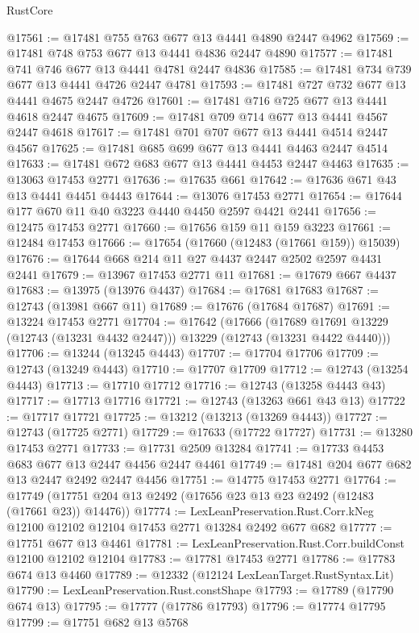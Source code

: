 \begin{lexlean}{RustCore}
\begin{coremodule}
@17561 := @17481 @755 @763 @677 @13 @4441 @4890 @2447 @4962
@17569 := @17481 @748 @753 @677 @13 @4441 @4836 @2447 @4890
@17577 := @17481 @741 @746 @677 @13 @4441 @4781 @2447 @4836
@17585 := @17481 @734 @739 @677 @13 @4441 @4726 @2447 @4781
@17593 := @17481 @727 @732 @677 @13 @4441 @4675 @2447 @4726
@17601 := @17481 @716 @725 @677 @13 @4441 @4618 @2447 @4675
@17609 := @17481 @709 @714 @677 @13 @4441 @4567 @2447 @4618
@17617 := @17481 @701 @707 @677 @13 @4441 @4514 @2447 @4567
@17625 := @17481 @685 @699 @677 @13 @4441 @4463 @2447 @4514
@17633 := @17481 @672 @683 @677 @13 @4441 @4453 @2447 @4463
@17635 := @13063 @17453 @2771
@17636 := @17635 @661
@17642 := @17636 @671 @43 @13 @4441 @4451 @4443
@17644 := @13076 @17453 @2771
@17654 := @17644 @177 @670 @11 @40 @3223 @4440 @4450 @2597 @4421 @2441
@17656 := @12475 @17453 @2771
@17660 := @17656 @159 @11 @159 @3223
@17661 := @12484 @17453
@17666 := @17654 (@17660 (@12483 (@17661 @159)) @15039)
@17676 := @17644 @668 @214 @11 @27 @4437 @2447 @2502 @2597 @4431 @2441
@17679 := @13967 @17453 @2771 @11
@17681 := @17679 @667 @4437
@17683 := @13975 (@13976 @4437)
@17684 := @17681 @17683
@17687 := @12743 (@13981 @667 @11)
@17689 := @17676 (@17684 @17687)
@17691 := @13224 @17453 @2771
@17704 := @17642
    (@17666
      (@17689 @17691 @13229 (@12743 (@13231 @4432 @2447)))
      @13229
      (@12743 (@13231 @4422 @4440)))
@17706 := @13244 (@13245 @4443)
@17707 := @17704 @17706
@17709 := @12743 (@13249 @4443)
@17710 := @17707 @17709
@17712 := @12743 (@13254 @4443)
@17713 := @17710 @17712
@17716 := @12743 (@13258 @4443 @43)
@17717 := @17713 @17716
@17721 := @12743 (@13263 @661 @43 @13)
@17722 := @17717 @17721
@17725 := @13212 (@13213 (@13269 @4443))
@17727 := @12743 (@17725 @2771)
@17729 := @17633 (@17722 @17727)
@17731 := @13280 @17453 @2771
@17733 := @17731 @2509 @13284
@17741 := @17733 @4453 @683 @677 @13 @2447 @4456 @2447 @4461
@17749 := @17481 @204 @677 @682 @13 @2447 @2492 @2447 @4456
@17751 := @14775 @17453 @2771
@17764 := @17749 (@17751 @204 @13 @2492 (@17656 @23 @13 @23 @2492 (@12483 (@17661 @23)) @14476))
@17774 := LexLeanPreservation.Rust.Corr.kNeg
    @12100
    @12102
    @12104
    @17453
    @2771
    @13284
    @2492
    @677
    @682
@17777 := @17751 @677 @13 @4461
@17781 := LexLeanPreservation.Rust.Corr.buildConst @12100 @12102 @12104
@17783 := @17781 @17453 @2771
@17786 := @17783 @674 @13 @4460
@17789 := @12332 (@12124 LexLeanTarget.RustSyntax.Lit)
@17790 := LexLeanPreservation.Rust.constShape
@17793 := @17789 (@17790 @674 @13)
@17795 := @17777 (@17786 @17793)
@17796 := @17774 @17795
@17799 := @17751 @682 @13 @5768

\end{coremodule}
\end{lexlean}
